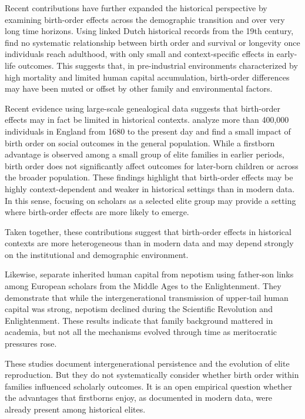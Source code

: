 Recent contributions have further expanded the historical perspective by examining birth-order effects across the demographic transition and over very long time horizons. Using linked Dutch historical records from the 19th century, \cite{holthaus2025birth} find no systematic relationship between birth order and survival or longevity once individuals reach adulthood, with only small and context-specific effects in early-life outcomes. This suggests that, in pre-industrial environments characterized by high mortality and limited human capital accumulation, birth-order differences may have been muted or offset by other family and environmental factors.

Recent evidence using large-scale genealogical data suggests that birth-order effects may in fact be limited in historical contexts. \citet{ClarkCummins2024} analyze more than 400,000 individuals in England from 1680 to the present day and find a small impact of birth order on social outcomes in the general population. While a firstborn advantage is observed among a small group of elite families in earlier periods, birth order does not significantly affect outcomes for later-born children or across the broader population. These findings highlight that birth-order effects may be highly context-dependent and weaker in historical settings than in modern data. In this sense, focusing on scholars as a selected elite group may provide a setting where birth-order effects are more likely to emerge.

Taken together, these contributions suggest that birth-order effects in historical contexts are more heterogeneous than in modern data and may depend strongly on the institutional and demographic environment.

Likewise, \cite{DelacroixGoni2024} separate inherited human capital from nepotism using father-son links among European scholars from the Middle Ages to the Enlightenment. They demonstrate that while the intergenerational transmission of upper-tail human capital was strong, nepotism declined during the Scientific Revolution and Enlightenment. These results indicate that family background mattered in academia, but not all the mechanisms evolved through time as meritocratic pressures rose.

These studies document intergenerational persistence and the evolution of elite reproduction. But they do not systematically consider whether birth order within families influenced scholarly outcomes. It is an open empirical question whether the advantages that firstborns enjoy, as documented in modern data, were already present among historical elites. 

